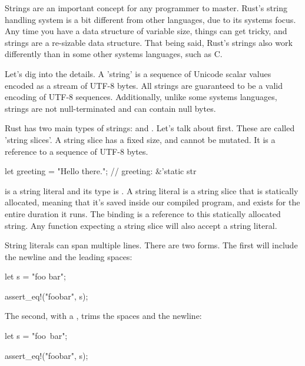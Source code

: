 Strings are an important concept for any programmer to master. Rust's string handling system is a bit different from other languages, due to 
its systems focus. Any time you have a data structure of variable size, things can get tricky, and strings are a re-sizable data structure. 
That being said, Rust's strings also work differently than in some other systems languages, such as C.

\blank

Let's dig into the details. A 'string' is a sequence of Unicode scalar values encoded as a stream of UTF-8 bytes. All strings are guaranteed 
to be a valid encoding of UTF-8 sequences. Additionally, unlike some systems languages, strings are not null-terminated and can contain null 
bytes.

\blank

Rust has two main types of strings:  and \String. Let's talk about  first. These are called 'string slices'. A string 
slice has a fixed size, and cannot be mutated. It is a reference to a sequence of UTF-8 bytes.

\begin{rustc}
let greeting = "Hello there."; // greeting: &'static str
\end{rustc}

 is a string literal and its type is . A string literal is a string slice that is statically allocated,
meaning that it's saved inside our compiled program, and exists for the entire duration it runs. The  binding is a reference to 
this statically allocated string. Any function expecting a string slice will also accept a string literal.

\blank

String literals can span multiple lines. There are two forms. The first will include the newline and the leading spaces:

\begin{rustc}
let s = "foo
    bar";

assert_eq!("foo\n        bar", s);
\end{rustc}

The second, with a \code{\\}, trims the spaces and the newline:

\begin{rustc}
let s = "foo\
    bar"; 

assert_eq!("foobar", s);
\end{rustc}


